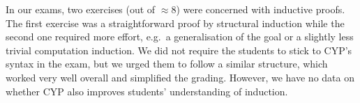 In our exams, two exercises (out of $\approx 8$) were concerned with inductive proofs.
The first exercise was a straightforward proof by structural induction while the second one required more effort, e.g.\ a generalisation of the goal or a slightly less trivial computation induction.
We did not require the students to stick to CYP's syntax in the exam, but we urged them to follow a similar structure,
which worked very well overall and simplified the grading.
However, we have no data on whether CYP also improves students' understanding of induction.

